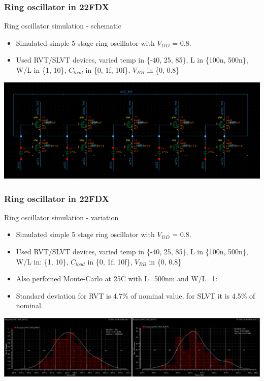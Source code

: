 \documentclass[t, screen, aspectratio=43]{beamer}
\begin{document}
\begin{frame}
	\frametitle{Ring oscillator in 22FDX}
	\begin{block}{Ring oscillator simulation - schematic}
		\begin{itemize}
			\scriptsize
			\item Simulated simple 5 stage ring oscillator with $V_{DD}$ = 0.8.
			\item Used RVT/SLVT devices, varied temp in \{-40, 25, 85\}, L in \{100n, 500n\}, W/L in \{1, 10\}, $C_{load}$ in \{0, 1f, 10f\}, $V_{BB}$ in \{0, 0.8\}
		\end{itemize}    
		\center\includegraphics[width=0.8\linewidth]{ro_schem.png}
	\end{block}
\end{frame}

\begin{frame}
	\frametitle{Ring oscillator in 22FDX}
	\begin{block}{Ring oscillator simulation - variation}
		\begin{itemize}
			\scriptsize
			\item Simulated simple 5 stage ring oscillator with $V_{DD}$ = 0.8.
			\item Used RVT/SLVT devices, varied temp in \{-40, 25, 85\}, L in \{100n, 500n\}, W/L in: \{1, 10\}, $C_{load}$ in \{0, 1f, 10f\}, $V_{BB}$ in \{0, 0.8\}
			\item Also perfomed Monte-Carlo at 25C with L=500nm and W/L=1:
			\item Standard deviation for RVT is 4.7\% of nominal value, for SLVT it is 4.5\% of nominal.
		\end{itemize}    
		\center\includegraphics[width=0.8\linewidth]{freq_var.png}
	\end{block}
\end{frame}
\end{document}
